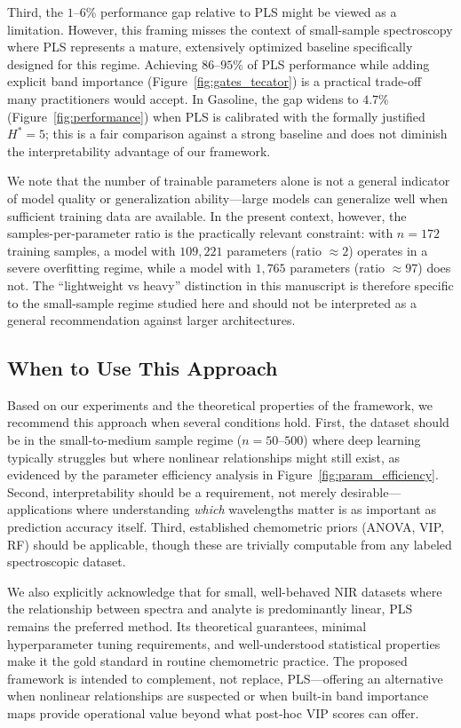 \documentclass[preprint,12pt]{elsarticle}
\begin{document}
Third, the $1$--$6$\% performance gap relative to PLS might be viewed as a limitation. However, this framing misses the context of small-sample spectroscopy where PLS represents a mature, extensively optimized baseline specifically designed for this regime. Achieving $86$--$95$\% of PLS performance while adding explicit band importance (Figure~\ref{fig:gates_tecator}) is a practical trade-off many practitioners would accept. In Gasoline, the gap widens to $4.7$\% (Figure~\ref{fig:performance}) when PLS is calibrated with the formally justified $H^*=5$; this is a fair comparison against a strong baseline and does not diminish the interpretability advantage of our framework.

We note that the number of trainable parameters alone is not a general indicator of model quality or generalization ability---large models can generalize well when sufficient training data are available. In the present context, however, the samples-per-parameter ratio is the practically relevant constraint: with $n=172$ training samples, a model with $109,221$ parameters (ratio $\approx 2$) operates in a severe overfitting regime, while a model with $1,765$ parameters (ratio $\approx 97$) does not. The ``lightweight vs heavy'' distinction in this manuscript is therefore specific to the small-sample regime studied here and should not be interpreted as a general recommendation against larger architectures.

\subsection{When to Use This Approach}

Based on our experiments and the theoretical properties of the framework, we recommend this approach when several conditions hold. First, the dataset should be in the small-to-medium sample regime ($n=50$--$500$) where deep learning typically struggles but where nonlinear relationships might still exist, as evidenced by the parameter efficiency analysis in Figure~\ref{fig:param_efficiency}. Second, interpretability should be a requirement, not merely desirable---applications where understanding \textit{which} wavelengths matter is as important as prediction accuracy itself. Third, established chemometric priors (ANOVA, VIP, RF) should be applicable, though these are trivially computable from any labeled spectroscopic dataset.

We also explicitly acknowledge that for small, well-behaved NIR datasets where the relationship between spectra and analyte is predominantly linear, PLS remains the preferred method. Its theoretical guarantees, minimal hyperparameter tuning requirements, and well-understood statistical properties make it the gold standard in routine chemometric practice. The proposed framework is intended to complement, not replace, PLS---offering an alternative when nonlinear relationships are suspected or when built-in band importance maps provide operational value beyond what post-hoc VIP scores can offer.
\end{document}
